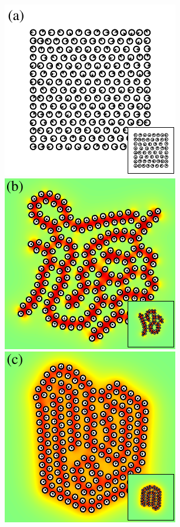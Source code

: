 \documentclass[aps,prl,preprint,groupedaddress]{revtex4-2}
\begin{document}
\begin{figure}[h!]
\begin{center}
  \includegraphics[height=0.27\textheight]{Nb198a_inset.pdf}
  \includegraphics[height=0.27\textheight]{Nb198b_eta_inset.pdf}\\
  \hspace{1.55cm}
  \includegraphics[height=0.27\textheight]{Nb198c_eta_inset.pdf}

\end{center}
\end{figure}
\end{document}
